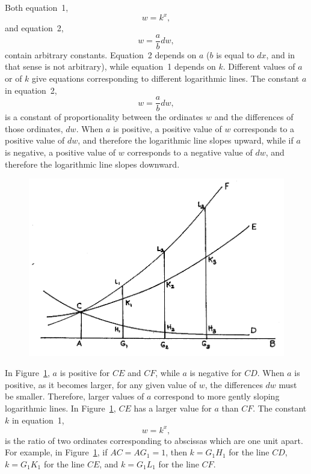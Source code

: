\documentclass[polutonikogreek,english,twoside,openright]{article}
\begin{document}
Both equation~1,\setcounter{equation}{0}
\begin{equation}
w= k^x,
\end{equation}
and equation~2,
\begin{equation}
w = \frac{a}{b}dw,
\end{equation}
contain arbitrary constants.  Equation~2 depends on $a$ ($b$ is equal
to $dx$, and in that sense is not arbitrary), while equation~1 depends
on $k$.  Different values of $a$ or of $k$ give equations
corresponding to different logarithmic lines.  The constant $a$ in
equation~2,
$$w = \frac{a}{b}dw,$$
is a constant of proportionality between the ordinates $w$ and the
differences of those ordinates, $dw$.  When $a$ is positive, a
positive value of $w$ corresponds to a positive value of $dw$, and
therefore the logarithmic line slopes upward, while if $a$ is
negative, a positive value of $w$ corresponds to a negative value of
$dw$, and therefore the logarithmic line slopes downward.
\begin{figure}[htp]
\begin{center}
\includegraphics[width=\textwidth]{fig/Figure27}
\caption{}
\label{logs2}
\vspace{-10pt}
\end{center}
\end{figure} 
In Figure~\ref{logs2}, $a$ is positive for $CE$ and $CF$, while $a$ is
negative for $CD$.  When $a$ is positive, as it becomes larger, for
any given value of $w$, the differences $dw$ must be smaller.
Therefore, larger values of $a$ correspond to more gently sloping
logarithmic lines.  In Figure~\ref{logs2}, $CE$ has a larger value for
$a$ than $CF$.  The constant $k$ in equation~1,
$$w = k^x,$$ 
is the ratio of two ordinates corresponding to abscissas which are one
unit apart.  For example, in Figure~\ref{logs2}, if $AC = AG_1 =1$,
then $k=G_1H_1$ for the line $CD$, $k= G_1K_1$ for the line $CE$, and
$k=G_1L_1$ for the line $CF$.
\end{document}
